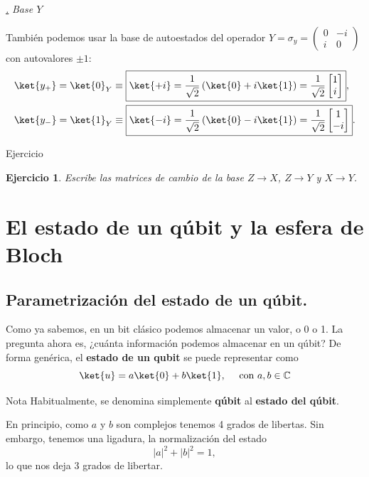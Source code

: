 \documentclass[a4paper,11pt]{book} %
\newtheorem{ejercicio_contador}{Ejercicio}
\newcommand{\Ejercicio}[1]{
		\begin{mybox_gray}{Ejercicio} 
			\begin{ejercicio_contador}
				 #1 
			\end{ejercicio_contador} 
		\end{mybox_gray}
	}
\numberwithin{equation}{chapter}
\def\lp{\left(}
\def\rp{\right)}
\def\subsubiContadorIt{\par\addtocounter{subsubsection}{1}\underline{\it\thesubsubsection.}\hskip0.5cm \setcounter{subsubsubsectionIt}{0}}
\newcommand{\SubsubiIt}[1]{
		\subsubiContadorIt \textit{#1}
	}
\newcounter{subsubsubsectionIt}[subsubsection]
\begin{document}
			\SubsubiIt{Base $Y$} 
			
También podemos usar la base de autoestados del operador $Y = \sigma_y = \lp \begin{matrix} 0 & -i \\ i & 0 \end{matrix} \rp $ con autovalores $\pm 1$:
	\begin{equation} \label{ec_qubit_y+}
	\begin{split}
	& \ket{y_+} = \ket{0}_Y \equiv \boxed{\ket{+i} = \frac{1}{\sqrt{2}} \lp \ket{0} + i \ket{1} \rp = \frac{1}{\sqrt{2}} \begin{bmatrix}  1 \\ i  \end{bmatrix}},  \\
	& \ket{y_-} = \ket{1}_Y \equiv \boxed{\ket{-i} =  \frac{1}{\sqrt{2}} \lp \ket{0} - i \ket{1} \rp = \frac{1}{\sqrt{2}} \begin{bmatrix}  1 \\ -i  \end{bmatrix}}. 
	\end{split}
	\end{equation}	
   	
	\Ejercicio{
	Escribe las matrices de cambio de la base $Z\to X$, $Z\to Y$ y $X\to Y$.
	}
	

    	
    \section{El estado de un qúbit y la esfera de Bloch}
    	\subsection{Parametrización del estado de un qúbit.}
    
Como ya sabemos, en un bit clásico podemos almacenar un valor, o 0 o 1. La pregunta ahora es, ¿cuánta información podemos almacenar en un qúbit? De forma genérica, el \textbf{estado de un qubit} se puede representar como
	\begin{equation}
	\ket{u} = a \ket{0} + b \ket{1}, ~~~~ \text{con } a,b \in \mathbb{C}
	\end{equation}
	
	\begin{mybox_blue}{Nota}
	Habitualmente, se denomina simplemente \textbf{qúbit} al \textbf{estado del qúbit}.
	\end{mybox_blue}	
	
En principio, como $a$ y $b$ son complejos tenemos 4 grados de libertas. Sin embargo, tenemos una ligadura, la normalización del estado
	\begin{equation}
	|a|^2 + |b|^2 = 1,
	\end{equation}
lo que nos deja 3 grados de libertar. 
\end{document}
